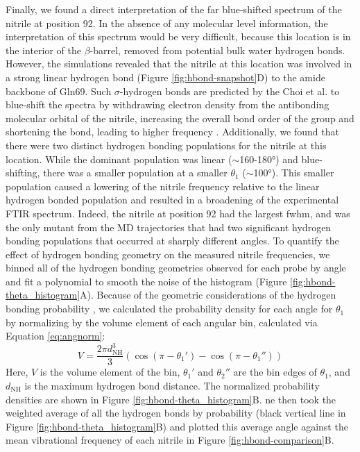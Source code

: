 Finally, we found a direct interpretation of the far blue-shifted spectrum of the nitrile at position 92.
In the absence of any molecular level information, the interpretation of this spectrum would be very difficult, because this location is in the interior of the $\beta$-barrel, removed from potential bulk water hydrogen bonds.
However, the simulations revealed that the nitrile at this location was involved in a strong linear hydrogen bond (Figure \ref{fig:hbond-snapshot}D) to the amide backbone of Gln69.
Such $\sigma$-hydrogen bonds are predicted by the Choi et al. to blue-shift the spectra by withdrawing electron density from the antibonding molecular orbital of the nitrile, increasing the overall bond order of the group and shortening the bond, leading to higher frequency \cite{Getahun2003, Adhikary2014, Eaton1988}.
Additionally, we found that there were two distinct hydrogen bonding populations for the nitrile at this location.
While the dominant population was linear ($\sim$160-\ang{180}) and blue-shifting, there was a smaller population at a smaller $\theta_1$ ($\sim$\ang{100}).
This smaller population caused a lowering of the nitrile frequency relative to the linear hydrogen bonded population and resulted in a broadening of the experimental FTIR spectrum.
Indeed, the nitrile at position 92 had the largest fwhm, and was the only mutant from the MD trajectories that had two significant hydrogen bonding populations that occurred at sharply different angles. 
To quantify the effect of hydrogen bonding geometry on the measured nitrile frequencies, we binned all of the hydrogen bonding geometries observed for each probe by angle and fit a polynomial to smooth the noise of the histogram (Figure \ref{fig:hbond-theta_histogram}A).
Because of the geometric considerations of the hydrogen bonding probability \cite{Kroon1975}, we calculated the probability density for each angle for $\theta_1$ by normalizing by the volume element of each angular bin, calculated via Equation \ref{eq:angnorm}: 
\begin{equation}
    V = \frac{2\pi d^3_{\text{NH}}}{3}(\cos(\pi-\theta_1') - \cos(\pi - \theta_1'')) 
    \label{eq:angnorm}
\end{equation}
Here, $V$ is the volume element of the bin, $\theta_1'$ and $\theta_2''$ are the bin edges of $\theta_1$, and $d_{\text{NH}}$ is the maximum hydrogen bond distance.
The normalized probability densities are shown in Figure \ref{fig:hbond-theta_histogram}B.
ne then took the weighted average of all the hydrogen bonds by probability (black vertical line in Figure \ref{fig:hbond-theta_histogram}B) and plotted this average angle against the mean vibrational frequency of each nitrile in Figure \ref{fig:hbond-comparison}B. 

